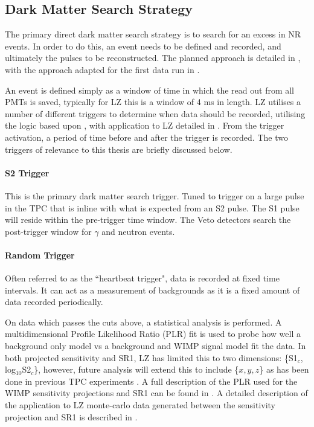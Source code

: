 \subsection{Dark Matter Search Strategy}
\par
The primary direct dark matter search strategy is to search for an excess in NR events.
In order to do this, an event needs to be defined and recorded, and ultimately the pulses to be reconstructed.
The planned approach is detailed in \cite{LZ_TechnicalDesignReview_ref}, with the approach adapted for the first data run in \cite{lz_ws_sr1_ref}.

\par
An event is defined simply as a window of time in which the read out from all PMTs is saved, typically for LZ this is a window of 4 ms in length.
LZ utilises a number of different triggers to determine when data should be recorded, utilising the logic based upon \cite{lux_trigger_logic_ref}, with application to LZ detailed in \cite{nicolasangelides_thesis_ref}.
From the trigger activation, a period of time before and after the trigger is recorded.
The two triggers of relevance to this thesis are briefly discussed below.

\paragraph{S2 Trigger}
\par
This is the primary dark matter search trigger.
Tuned to trigger on a large pulse in the TPC that is inline with what is expected from an S2 pulse.
The S1 pulse will reside within the pre-trigger time window.
The Veto detectors search the post-trigger window for $\gamma$ and neutron events.

\paragraph{Random Trigger}
Often referred to as the ``heartbeat trigger", data is recorded at fixed time intervals.
It can act as a measurement of backgrounds as it is a fixed amount of data recorded periodically.

\par
On data which passes the cuts above, a statistical analysis is performed.
A multidimensional Profile Likelihood Ratio (PLR) fit is used to probe how well a background only model vs a background and WIMP signal model fit the data.
In both projected sensitivity and SR1, LZ has limited this to two dimensions: \{S1$_c$, log$_{10}$S2$_c$\}, however, future analysis will extend this to include \{$x,y,z$\} as has been done in previous TPC experiments \cite{LUX_RUN1_EFT_2021,LUX_RUN4_EFT_2021,shaunalsum_thesis_ref}.
A full description of the PLR used for the WIMP sensitivity projections and SR1 can be found in \cite{LZ_Ibles_LZStats_Thesis_ref}. 
A detailed description of the application to LZ monte-carlo data generated between the sensitivity projection and SR1 is described in \cite{jonathannikoleyczik_thesis_ref}.

